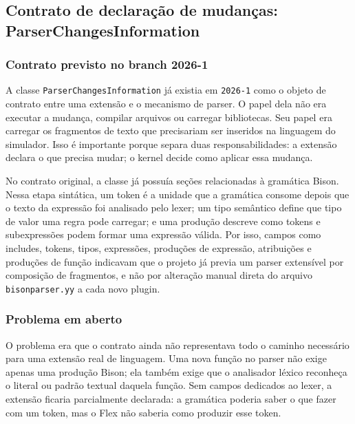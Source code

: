 \documentclass[12pt,a4paper]{article}
\begin{document}
\subsection{Contrato de declara\c{c}\~ao de mudan\c{c}as: ParserChangesInformation}

\subsubsection{Contrato previsto no branch 2026-1}

A classe \texttt{ParserChangesInformation} j\'a existia em \texttt{2026-1} como o objeto de contrato entre uma extens\~ao e o mecanismo de parser. O papel dela n\~ao era executar a mudan\c{c}a, compilar arquivos ou carregar bibliotecas. Seu papel era carregar os fragmentos de texto que precisariam ser inseridos na linguagem do simulador. Isso \'e importante porque separa duas responsabilidades: a extens\~ao declara o que precisa mudar; o kernel decide como aplicar essa mudan\c{c}a.

No contrato original, a classe j\'a possu\'ia se\c{c}\~oes relacionadas \`a gram\'atica Bison. Nessa etapa sint\'atica, um token \'e a unidade que a gram\'atica consome depois que o texto da express\~ao foi analisado pelo lexer; um tipo sem\^antico define que tipo de valor uma regra pode carregar; e uma produ\c{c}\~ao descreve como tokens e subexpress\~oes podem formar uma express\~ao v\'alida. Por isso, campos como includes, tokens, tipos, express\~oes, produ\c{c}\~oes de express\~ao, atribui\c{c}\~oes e produ\c{c}\~oes de fun\c{c}\~ao indicavam que o projeto j\'a previa um parser extens\'ivel por composi\c{c}\~ao de fragmentos, e n\~ao por altera\c{c}\~ao manual direta do arquivo \texttt{bisonparser.yy} a cada novo plugin.

\subsubsection{Problema em aberto}

O problema era que o contrato ainda n\~ao representava todo o caminho necess\'ario para uma extens\~ao real de linguagem. Uma nova fun\c{c}\~ao no parser n\~ao exige apenas uma produ\c{c}\~ao Bison; ela tamb\'em exige que o analisador l\'exico reconhe\c{c}a o literal ou padr\~ao textual daquela fun\c{c}\~ao. Sem campos dedicados ao lexer, a extens\~ao ficaria parcialmente declarada: a gram\'atica poderia saber o que fazer com um token, mas o Flex n\~ao saberia como produzir esse token.
\end{document}
